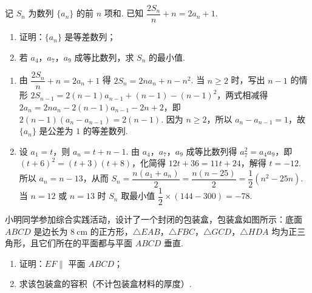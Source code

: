 \begin{problem}
记 \(S_n\) 为数列 \(\{a_n\}\) 的前 \(n\) 项和. 已知 \(\dfrac{2S_n}{n}+n=2a_n+1\).

\begin{enumerate}
\item 证明：\(\{a_n\}\) 是等差数列；
\item 若 \(a_4\)，\(a_7\)，\(a_9\) 成等比数列，求 \(S_n\) 的最小值.
\end{enumerate}
\end{problem}

\begin{solution}
\begin{enumerate}
\item 由 \(\dfrac{2S_n}{n}+n=2a_n+1\) 得 \(2S_n=2na_n+n-n^2\). 当 \(n\ge2\) 时，写出 \(n-1\) 的情形 \(2S_{n-1}=2(n-1)a_{n-1}+(n-1)-(n-1)^2\)，两式相减得 \(2a_n=2na_n-2(n-1)a_{n-1}-2n+2\)，即 \(2(n-1)(a_n-a_{n-1})=2(n-1)\). 因为 \(n\ge2\)，所以 \(a_n-a_{n-1}=1\)，故 \(\{a_n\}\) 是公差为 \(1\) 的等差数列.

\item 设 \(a_1=t\)，则 \(a_n=t+n-1\). 由 \(a_4\)，\(a_7\)，\(a_9\) 成等比数列得 \(a_7^2=a_4a_9\)，即 \((t+6)^2=(t+3)(t+8)\)，化简得 \(12t+36=11t+24\)，解得 \(t=-12\). 所以 \(a_n=n-13\)，从而 \(S_n=\dfrac{n(a_1+a_n)}2=\dfrac{n(n-25)}2=\dfrac12(n^2-25n)\). 当 \(n=12\) 或 \(n=13\) 时 \(S_n\) 取最小值 \(\dfrac12\times(144-300)=-78\).
\end{enumerate}
\end{solution}

\begin{problem}
小明同学参加综合实践活动，设计了一个封闭的包装盒，包装盒如图所示：底面 \(ABCD\) 是边长为 \(8\mathrm{~cm}\) 的正方形，\(\triangle EAB\)，\(\triangle FBC\)，\(\triangle GCD\)，\(\triangle HDA\) 均为正三角形，且它们所在的平面都与平面 \(ABCD\) 垂直.

\begin{enumerate}
\item 证明：\(EF\parallel\) 平面 \(ABCD\)；
\item 求该包装盒的容积（不计包装盒材料的厚度）.
\end{enumerate}

\end{problem}

